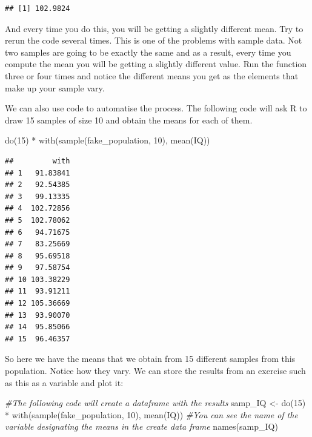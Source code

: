 \documentclass[
]{book}
\newenvironment{Shaded}{\begin{snugshade}}{\end{snugshade}}
\newcommand{\CommentTok}[1]{\textcolor[rgb]{0.56,0.35,0.01}{\textit{#1}}}
\newcommand{\DecValTok}[1]{\textcolor[rgb]{0.00,0.00,0.81}{#1}}
\newcommand{\FunctionTok}[1]{\textcolor[rgb]{0.00,0.00,0.00}{#1}}
\newcommand{\NormalTok}[1]{#1}
\newcommand{\OtherTok}[1]{\textcolor[rgb]{0.56,0.35,0.01}{#1}}
\newcommand{\SpecialCharTok}[1]{\textcolor[rgb]{0.00,0.00,0.00}{#1}}
\begin{document}
\begin{verbatim}
## [1] 102.9824
\end{verbatim}

And every time you do this, you will be getting a slightly different mean. Try to rerun the code several times. This is one of the problems with sample data. Not two samples are going to be exactly the same and as a result, every time you compute the mean you will be getting a slightly different value. Run the function three or four times and notice the different means you get as the elements that make up your sample vary.

We can also use code to automatise the process. The following code will ask R to draw 15 samples of size 10 and obtain the means for each of them.

\begin{Shaded}
\begin{Highlighting}[]
\FunctionTok{do}\NormalTok{(}\DecValTok{15}\NormalTok{) }\SpecialCharTok{*} \FunctionTok{with}\NormalTok{(}\FunctionTok{sample}\NormalTok{(fake\_population, }\DecValTok{10}\NormalTok{), }\FunctionTok{mean}\NormalTok{(IQ))}
\end{Highlighting}
\end{Shaded}

\begin{verbatim}
##         with
## 1   91.83841
## 2   92.54385
## 3   99.13335
## 4  102.72856
## 5  102.78062
## 6   94.71675
## 7   83.25669
## 8   95.69518
## 9   97.58754
## 10 103.38229
## 11  93.91211
## 12 105.36669
## 13  93.90070
## 14  95.85066
## 15  96.46357
\end{verbatim}

So here we have the means that we obtain from 15 different samples from this population. Notice how they vary. We can store the results from an exercise such as this as a variable and plot it:

\begin{Shaded}
\begin{Highlighting}[]
\CommentTok{\#The following code will create a dataframe with the results}
\NormalTok{samp\_IQ }\OtherTok{\textless{}{-}} \FunctionTok{do}\NormalTok{(}\DecValTok{15}\NormalTok{) }\SpecialCharTok{*} \FunctionTok{with}\NormalTok{(}\FunctionTok{sample}\NormalTok{(fake\_population, }\DecValTok{10}\NormalTok{), }\FunctionTok{mean}\NormalTok{(IQ))}
\CommentTok{\#You can see the name of the variable designating the means in the create data frame}
\FunctionTok{names}\NormalTok{(samp\_IQ)}
\end{Highlighting}
\end{Shaded}
\end{document}
